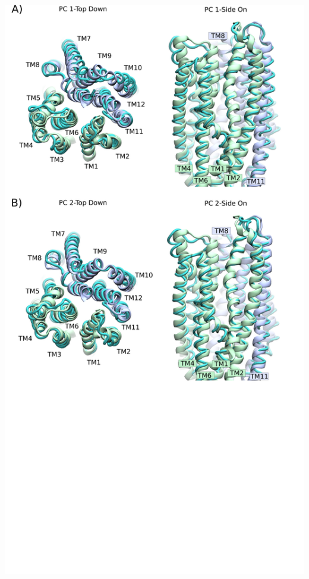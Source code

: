 	\begin{center}
		\includegraphics[width=1\textwidth]{figures/opening/pca_motions.pdf}
	\end{center}
	\begingroup
	\captionsetup{singlelinecheck = false, justification=raggedright}
